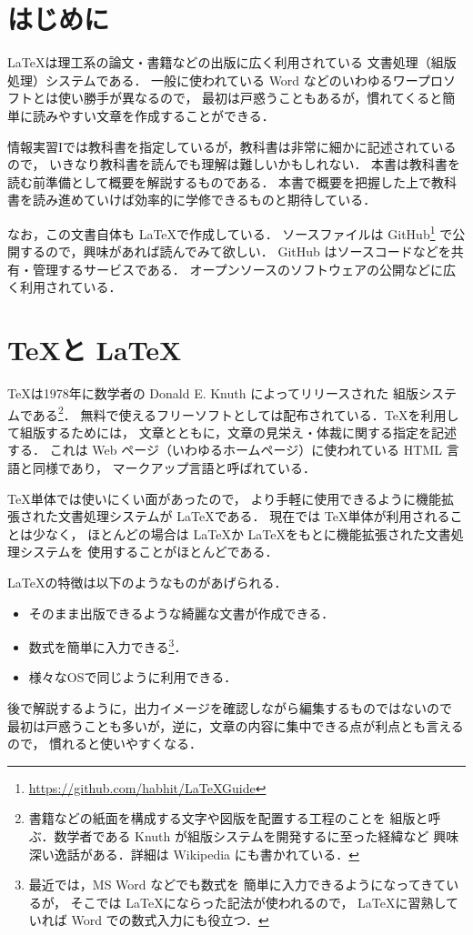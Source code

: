 \section{はじめに}

\LaTeX は理工系の論文・書籍などの出版に広く利用されている
文書処理（組版処理）システムである．
一般に使われている Word などのいわゆるワープロソフトとは使い勝手が異なるので，
最初は戸惑うこともあるが，慣れてくると簡単に読みやすい文章を作成することができる．

情報実習Iでは教科書\cite{TeXText}を指定しているが，教科書は非常に細かに記述されているので，
いきなり教科書を読んでも理解は難しいかもしれない．
本書は教科書を読む前準備として概要を解説するものである．
本書で概要を把握した上で教科書を読み進めていけば効率的に学修できるものと期待している．

なお，この文書自体も \LaTeX で作成している．
ソースファイルは GitHub\footnote{\url{https://github.com/habhit/LaTeXGuide}}
で公開するので，興味があれば読んでみて欲しい．
GitHub はソースコードなどを共有・管理するサービスである．
オープンソースのソフトウェアの公開などに広く利用されている．

\section{\TeX と \LaTeX}
\label{sec:TeXandLaTeX}

\TeX は1978年に数学者の Donald E. Knuth によってリリースされた
組版システムである\footnote{書籍などの紙面を構成する文字や図版を配置する工程のことを
組版と呼ぶ．数学者である Knuth が組版システムを開発するに至った経緯など
興味深い逸話がある．詳細は Wikipedia にも書かれている．}．
無料で使えるフリーソフトとしては配布されている．TeXを利用して組版するためには，
文章とともに，文章の見栄え・体裁に関する指定を記述する．
これは Web ページ（いわゆるホームページ）に使われている HTML 言語と同様であり，
マークアップ言語と呼ばれている．

\TeX 単体では使いにくい面があったので，
より手軽に使用できるように機能拡張された文書処理システムが \LaTeX である．
現在では \TeX 単体が利用されることは少なく，
ほとんどの場合は \LaTeX か \LaTeX をもとに機能拡張された文書処理システムを
使用することがほとんどである．

\LaTeX の特徴は以下のようなものがあげられる．
\begin{itemize}
\item そのまま出版できるような綺麗な文書が作成できる．
\item 数式を簡単に入力できる\footnote{最近では，MS Word などでも数式を
簡単に入力できるようになってきているが，
そこでは \LaTeX にならった記法が使われるので，
\LaTeX に習熟していれば Word での数式入力にも役立つ．}．
\item 様々なOSで同じように利用できる．
\end{itemize}
後で解説するように，出力イメージを確認しながら編集するものではないので
最初は戸惑うことも多いが，逆に，文章の内容に集中できる点が利点とも言えるので，
慣れると使いやすくなる．

